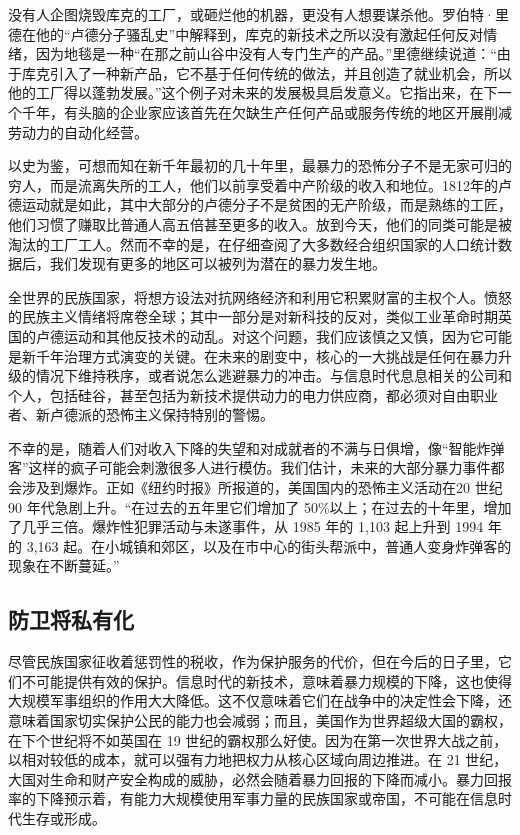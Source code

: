 没有人企图烧毁库克的工厂，或砸烂他的机器，更没有人想要谋杀他。罗伯特·里德在他的“卢德分子骚乱史”中解释到，库克的新技术之所以没有激起任何反对情绪，因为地毯是一种“在那之前山谷中没有人专门生产的产品。”里德继续说道：“由于库克引入了一种新产品，它不基于任何传统的做法，并且创造了就业机会，所以他的工厂得以蓬勃发展。”这个例子对未来的发展极具启发意义。它指出来，在下一个千年，有头脑的企业家应该首先在欠缺生产任何产品或服务传统的地区开展削减劳动力的自动化经营。

以史为鉴，可想而知在新千年最初的几十年里，最暴力的恐怖分子不是无家可归的穷人，而是流离失所的工人，他们以前享受着中产阶级的收入和地位。1812年的卢德运动就是如此，其中大部分的卢德分子不是贫困的无产阶级，而是熟练的工匠，他们习惯了赚取比普通人高五倍甚至更多的收入。放到今天，他们的同类可能是被淘汰的工厂工人。然而不幸的是，在仔细查阅了大多数经合组织国家的人口统计数据后，我们发现有更多的地区可以被列为潜在的暴力发生地。

全世界的民族国家，将想方设法对抗网络经济和利用它积累财富的主权个人。愤怒的民族主义情绪将席卷全球；其中一部分是对新科技的反对，类似工业革命时期英国的卢德运动和其他反技术的动乱。对这个问题，我们应该慎之又慎，因为它可能是新千年治理方式演变的关键。在未来的剧变中，核心的一大挑战是任何在暴力升级的情况下维持秩序，或者说怎么逃避暴力的冲击。与信息时代息息相关的公司和个人，包括硅谷，甚至包括为新技术提供动力的电力供应商，都必须对自由职业者、新卢德派的恐怖主义保持特别的警惕。

不幸的是，随着人们对收入下降的失望和对成就者的不满与日俱增，像“智能炸弹客”这样的疯子可能会刺激很多人进行模仿。我们估计，未来的大部分暴力事件都会涉及到爆炸。正如《纽约时报》所报道的，美国国内的恐怖主义活动在20 世纪 90 年代急剧上升。“在过去的五年里它们增加了 50\%以上；在过去的十年里，增加了几乎三倍。爆炸性犯罪活动与未遂事件，从 1985 年的 1,103 起上升到 1994 年的 3,163 起。在小城镇和郊区，以及在市中心的街头帮派中，普通人变身炸弹客的现象在不断蔓延。”

\subsection{防卫将私有化}
尽管民族国家征收着惩罚性的税收，作为保护服务的代价，但在今后的日子里，它们不可能提供有效的保护。信息时代的新技术，意味着暴力规模的下降，这也使得大规模军事组织的作用大大降低。这不仅意味着它们在战争中的决定性会下降，还意味着国家切实保护公民的能力也会减弱；而且，美国作为世界超级大国的霸权，在下个世纪将不如英国在 19 世纪的霸权那么好使。因为在第一次世界大战之前，以相对较低的成本，就可以强有力地把权力从核心区域向周边推进。在 21 世纪，大国对生命和财产安全构成的威胁，必然会随着暴力回报的下降而减小。暴力回报率的下降预示着，有能力大规模使用军事力量的民族国家或帝国，不可能在信息时代生存或形成。


